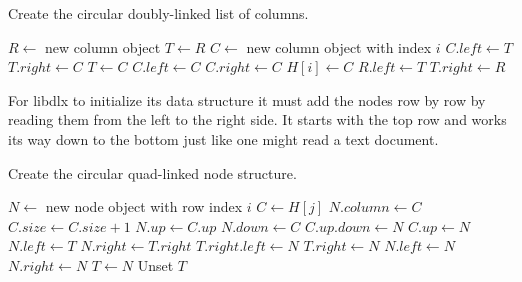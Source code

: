 \begin{algorithm}[H]
	\caption{Create the circular doubly-linked list of columns.}
	\label{algocolumns}
	\begin{distribalgo}[1]
		\STATE $R \leftarrow$ new column object
		\STATE $T \leftarrow R$
			\STATE $C \leftarrow$ new column object with index $i$
				\STATE $C.left \leftarrow T$
				\STATE $T.right \leftarrow C$
				\STATE $T \leftarrow C$
			\ELSE \label{algosecondary}
				\STATE $C.left \leftarrow C$
				\STATE $C.right \leftarrow C$
			\ENDIF
			\STATE $H[i] \leftarrow C$
		\ENDFOR
		\STATE $R.left \leftarrow T$
		\STATE $T.right \leftarrow R$
	\end{distribalgo}
\end{algorithm}

For libdlx to initialize its data structure it must add the nodes row by row by reading them from the left to the right side.
It starts with the top row and works its way down to the bottom just like one might read a text document.

\begin{algorithm}[H]
	\caption{Create the circular quad-linked node structure.}
	\label{algonodes}
	\begin{distribalgo}[1]
				\STATE $N \leftarrow$ new node object with row index $i$
				\STATE $C \leftarrow H[j]$
				\STATE $N.column \leftarrow C$
				\STATE $C.size \leftarrow C.size + 1$
				\STATE $N.up \leftarrow C.up$
				\STATE $N.down \leftarrow C$
				\STATE $C.up.down \leftarrow N$
				\STATE $C.up \leftarrow N$
					\STATE $N.left \leftarrow T$
					\STATE $N.right \leftarrow T.right$
					\STATE $T.right.left \leftarrow N$
					\STATE $T.right \leftarrow N$
				\ELSE
					\STATE $N.left \leftarrow N$  
					\STATE $N.right \leftarrow N$
				\ENDIF
				\STATE $T \leftarrow N$
			\ENDFOR
			\STATE Unset $T$
		\ENDFOR
	\end{distribalgo}
\end{algorithm}

